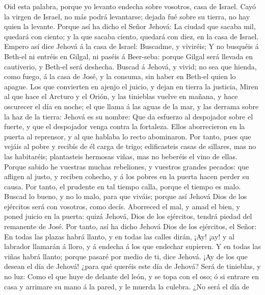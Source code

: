  Oid esta palabra, porque yo levanto endecha sobre vosotros,
casa de Israel.  Cayó la virgen de Israel, no más podrá
levantarse; dejada fué sobre su tierra, no hay quien la levante.
 Porque así ha dicho el Señor Jehová: La ciudad que sacaba
mil, quedará con ciento; y la que sacaba ciento, quedará con diez, en la
casa de Israel.  Empero así dice Jehová á la casa de Israel:
Buscadme, y viviréis;  Y no busquéis á Beth-el ni entréis en
Gilgal, ni paséis á Beer-seba: porque Gilgal será llevada en cautiverio,
y Beth-el será deshecha.  Buscad á Jehová, y vivid; no sea
que hienda, como fuego, á la casa de José, y la consuma, sin haber en
Beth-el quien lo apague.  Los que convierten en ajenjo el
juicio, y dejan en tierra la justicia,  Miren al que hace el
Arcturo y el Orión, y las tinieblas vuelve en mañana, y hace oscurecer
el día en noche; el que llama á las aguas de la mar, y las derrama sobre
la haz de la tierra: Jehová es su nombre:  Que da esfuerzo
al despojador sobre el fuerte, y que el despojador venga contra la
fortaleza.  Ellos aborrecieron en la puerta al reprensor, y
al que hablaba lo recto abominaron.  Por tanto, pues que
vejáis al pobre y recibís de él carga de trigo; edificasteis casas de
sillares, mas no las habitaréis; plantasteis hermosas viñas, mas no
beberéis el vino de ellas.  Porque sabido he vuestras
muchas rebeliones, y vuestros grandes pecados: que afligen al justo, y
reciben cohecho, y á los pobres en la puerta hacen perder su causa.
 Por tanto, el prudente en tal tiempo calla, porque el
tiempo es malo.  Buscad lo bueno, y no lo malo, para que
viváis; porque así Jehová Dios de los ejércitos será con vosotros, como
decís.  Aborreced el mal, y amad el bien, y poned juicio en
la puerta: quizá Jehová, Dios de los ejércitos, tendrá piedad del
remanente de José.  Por tanto, así ha dicho Jehová Dios de
los ejércitos, el Señor: En todas las plazas habrá llanto, y en todas
las calles dirán, ¡Ay! ¡ay! y al labrador llamarán á lloro, y á endecha
á los que endechar supieren.  Y en todas las viñas habrá
llanto; porque pasaré por medio de ti, dice Jehová.  ¡Ay de
los que desean el día de Jehová! ¿para qué queréis este día de Jehová?
Será de tinieblas, y no luz:  Como el que huye de delante
del león, y se topa con el oso; ó si entrare en casa y arrimare su mano
á la pared, y le muerda la culebra.  ¿No será el día de
